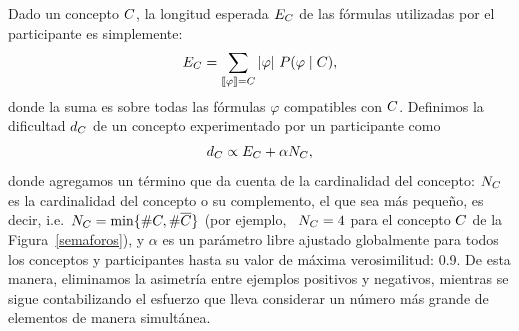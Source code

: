 Dado un concepto $C$, la longitud esperada $E_C$ de las fórmulas utilizadas por el participante es simplemente:
%
 \begin{equation}
E_C=\sum_{\llbracket \varphi\rrbracket=C} |\varphi| \ P(\varphi \mid C),
 \label{expected length}
 \end{equation}
%
donde la suma es sobre todas las fórmulas $\varphi$ compatibles con $C$. Definimos la dificultad $d_C$ de un concepto experimentado por un participante como $$d_C \propto E_C + \alpha N_C,$$
%
%
donde agregamos un término que da cuenta de la cardinalidad del concepto: $N_C$ es la cardinalidad del concepto o su complemento, el que sea más pequeño, es decir, i.e.\ $N_C=\min \{ \#C, \#\overline {C}\}$ (por ejemplo, \ $N_C=4$ para el concepto $C$ de la Figura~\ref{semaforos}), y $\alpha$ es un parámetro libre ajustado globalmente para todos los conceptos y participantes hasta su valor de máxima verosimilitud: 0.9. De esta manera, eliminamos la asimetría entre ejemplos positivos y negativos, mientras se sigue contabilizando el esfuerzo que lleva considerar un número más grande de elementos de manera simultánea.


